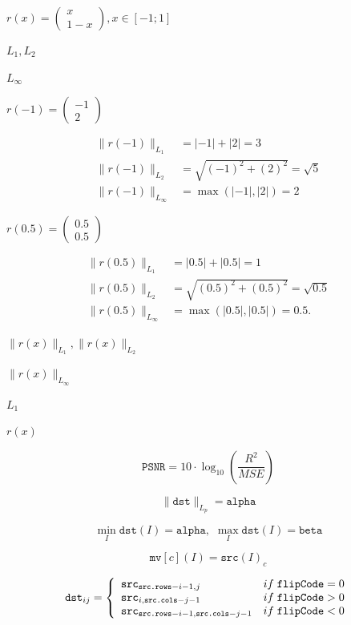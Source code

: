 \documentclass{article}
\begin{document}
$r(x)= \begin{pmatrix} x \\ 1-x \end{pmatrix}, x \in [-1;1]$
\pagebreak

$ L_{1}, L_{2} $
\pagebreak

$ L_{\infty} $
\pagebreak

$r(-1) = \begin{pmatrix} -1 \\ 2 \end{pmatrix}$
\pagebreak

\begin{align*}    \| r(-1) \|_{L_1} &= |-1| + |2| = 3 \\
    \| r(-1) \|_{L_2} &= \sqrt{(-1)^{2} + (2)^{2}} = \sqrt{5} \\
    \| r(-1) \|_{L_\infty} &= \max(|-1|,|2|) = 2
\end{align*}
\pagebreak

$r(0.5) = \begin{pmatrix} 0.5 \\ 0.5 \end{pmatrix}$
\pagebreak

\begin{align*}    \| r(0.5) \|_{L_1} &= |0.5| + |0.5| = 1 \\
    \| r(0.5) \|_{L_2} &= \sqrt{(0.5)^{2} + (0.5)^{2}} = \sqrt{0.5} \\
    \| r(0.5) \|_{L_\infty} &= \max(|0.5|,|0.5|) = 0.5.
\end{align*}
\pagebreak

$\| r(x) \|_{L_1}, \| r(x) \|_{L_2}$
\pagebreak

$\| r(x) \|_{L_\infty}$
\pagebreak

$ L_{1} $
\pagebreak

$ r(x) $
\pagebreak

\[\texttt{PSNR} = 10 \cdot \log_{10}{\left( \frac{R^2}{MSE} \right) }
\]
\pagebreak

\[\| \texttt{dst} \| _{L_p}= \texttt{alpha}\]
\pagebreak

\[\min _I  \texttt{dst} (I)= \texttt{alpha} , \, \, \max _I  \texttt{dst} (I)= \texttt{beta}\]
\pagebreak

\[\texttt{mv} [c](I) =  \texttt{src} (I)_c\]
\pagebreak

\[\texttt{dst} _{ij} =
\left\{
\begin{array}{l l}
\texttt{src} _{\texttt{src.rows}-i-1,j} & if\;  \texttt{flipCode} = 0 \\
\texttt{src} _{i, \texttt{src.cols} -j-1} & if\;  \texttt{flipCode} > 0 \\
\texttt{src} _{ \texttt{src.rows} -i-1, \texttt{src.cols} -j-1} & if\; \texttt{flipCode} < 0 \\
\end{array}
\right.\]
\pagebreak
\end{document}
